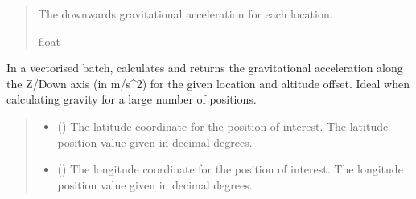 \documentclass[letterpaper,10pt,english]{sphinxmanual}
\begin{document}
\begin{fulllineitems}
\begin{fulllineitems}
\begin{quote}
\begin{description}
\begin{itemize}
\end{itemize}

\sphinxAtStartPar
The downwards gravitational acceleration for each location.

\sphinxAtStartPar
float

\end{description}\end{quote}

\end{fulllineitems}


\begin{fulllineitems}
\label{\detokenize{modules/gravity/simple:qnav.gravity.simple.FixedValue.calc_gravity_z_vec}}
\pysigstartsignatures
{}
\pysigstopsignatures
\sphinxAtStartPar
In a vectorised batch, calculates and returns the gravitational
acceleration along the Z/Down axis (in m/s\textasciicircum{}2) for the given location
and altitude offset. Ideal when calculating gravity for a large
number of positions.
\begin{quote}\begin{description}
\begin{itemize}
\item {} 
\sphinxAtStartPar
{} () \textendash{} The latitude coordinate for the position of interest.
The latitude position value given in decimal degrees.

\item {} 
\sphinxAtStartPar
{} () \textendash{} The longitude coordinate for the position of interest.
The longitude position value given in decimal degrees.


\end{itemize}
\end{description}
\end{quote}
\end{fulllineitems}
\end{fulllineitems}
\end{document}
